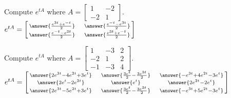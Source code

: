 \documentclass{ximera}
\begin{document}
\begin{exercise}%
    Compute $e^{tA}$ where
    $A=\left[ \begin{smallmatrix}
        1 & -2 \\
        -2 & 1 
    \end{smallmatrix}\right]$.\\
    $e^{tA}=\left[ \begin{smallmatrix}
    \answer{\frac{{e}^{3t}+{e}^{-t}}{2}} & \quad
    \answer{\frac{{e}^{-t}-{e}^{3t}}{2}}\\
    \answer{\frac{{e}^{-t}-{e}^{3t}}{2}} & \quad
    \answer{\frac{{e}^{3t}+{e}^{-t}}{2}}
    \end{smallmatrix}\right]$
\end{exercise}

\begin{exercise}%
    Compute
    $e^{tA}$ where
    $A=\left[ \begin{smallmatrix}
        1 & -3 & 2 \\
        -2 & 1 & 2 \\
        -1 & -3 & 4
    \end{smallmatrix}\right]$.\\
    $e^{tA}=\left[ \begin{smallmatrix}
    \answer{2{e}^{3t}-4{e}^{2t}+3{e}^{t}} & \quad
    \answer{\frac{3{e}^{t}}{2}-\frac{3{e}^{3t}}{2}} & \quad
    \answer{-{e}^{3t}+4{e}^{2t}-3{e}^{t}} \\
    \answer{2{e}^{t}-2{e}^{2t}} & \quad
    \answer{{e}^{t}} & \quad
    \answer{2{e}^{2t}-2{e}^{t}} \\
    \answer{2{e}^{3t}-5{e}^{2t}+3{e}^{t}} & \quad
    \answer{\frac{3{e}^{t}}{2}-\frac{3{e}^{3t}}{2}} & \quad
    \answer{-{e}^{3t}+5{e}^{2t}-3{e}^{t}}
    \end{smallmatrix}\right]$
\end{exercise}
\end{document}
